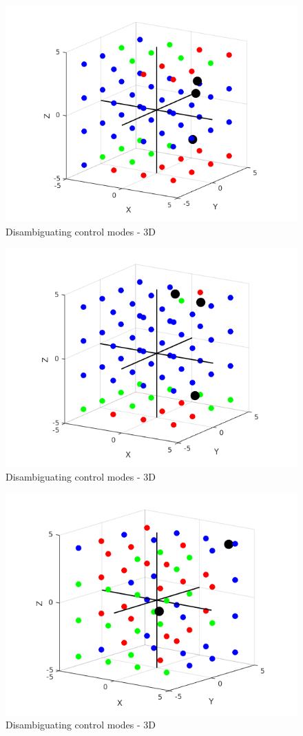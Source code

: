 \documentclass[]{article}
\begin{document}
\begin{figure}[H]
	\centering
	\includegraphics[width = 0.6\hsize, height = 0.3\vsize]{./figures/3DConfig1.png}
	\vspace{-0.4cm}
	\caption{Disambiguating control modes - 3D}
\end{figure}
\begin{figure}[h!]
	\centering
	\includegraphics[width = 0.6\hsize, height = 0.3\vsize]{./figures/3DConfig2.png}
	\vspace{-0.4cm}
	\caption{Disambiguating control modes - 3D}
\end{figure}
\begin{figure}[H]
	\centering
	\includegraphics[width = 0.6\hsize, height = 0.3\vsize]{./figures/3DConfig3.png}
	\vspace{-0.4cm}
	\caption{Disambiguating control modes - 3D}
\end{figure}
\end{document}
